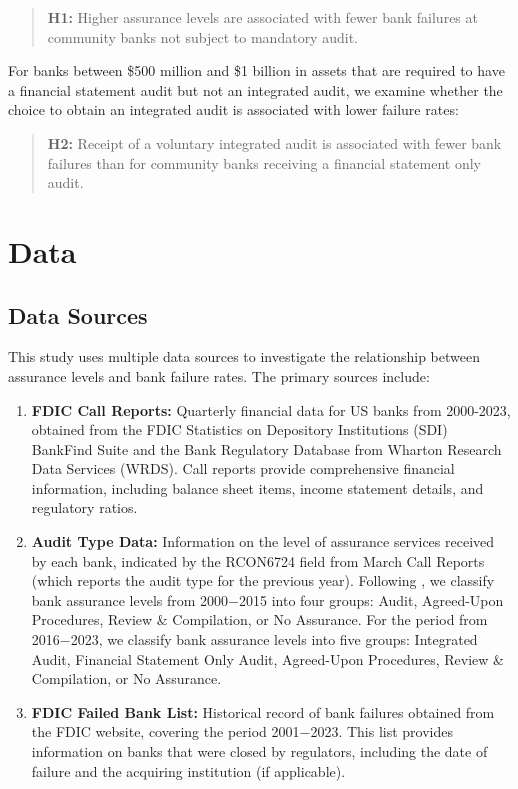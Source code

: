 \documentclass[12pt]{article}
\begin{document}
\begin{quote}
\textbf{H1:} Higher assurance levels are associated with fewer bank failures at community banks not subject to mandatory audit.
\end{quote}

For banks between \$500 million and \$1 billion in assets that are required to have a financial statement audit but not an integrated audit, we examine whether the choice to obtain an integrated audit is associated with lower failure rates:

\begin{quote}
\textbf{H2:} Receipt of a voluntary integrated audit is associated with fewer bank failures than for community banks receiving a financial statement only audit.
\end{quote}

\section{Data}

\subsection{Data Sources}

This study uses multiple data sources to investigate the relationship between assurance levels and bank failure rates. The primary sources include:

\begin{enumerate}
    \item \textbf{FDIC Call Reports:} Quarterly financial data for US banks from 2000-2023, obtained from the FDIC Statistics on Depository Institutions (SDI) BankFind Suite and the Bank Regulatory Database from Wharton Research Data Services (WRDS). Call reports provide comprehensive financial information, including balance sheet items, income statement details, and regulatory ratios.
    
    \item \textbf{Audit Type Data:} Information on the level of assurance services received by each bank, indicated by the RCON6724 field from March Call Reports (which reports the audit type for the previous year). Following \citet{Douglass2016}, we classify bank assurance levels from 2000$-$2015 into four groups: Audit, Agreed-Upon Procedures, Review \& Compilation, or No Assurance. For the period from 2016$-$2023, we classify bank assurance levels into five groups: Integrated Audit, Financial Statement Only Audit, Agreed-Upon Procedures, Review \& Compilation, or No Assurance.
    
    \item \textbf{FDIC Failed Bank List:} Historical record of bank failures obtained from the FDIC website, covering the period 2001$-$2023. This list provides information on banks that were closed by regulators, including the date of failure and the acquiring institution (if applicable).
\end{enumerate}
\end{document}

